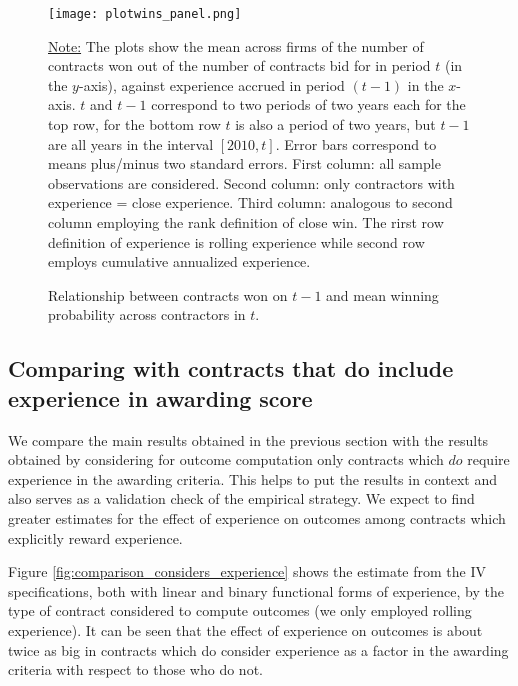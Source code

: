 \begin{figure}
  \texttt{[image: plotwins\_panel.png]}
  \caption{Relationship between contracts won on $t-1$ and mean winning probability across contractors in $t$.}
  \label{fig:plotresults_both}
  \vskip 0.5mm
  { \footnotesize \underline{Note:} The plots show the mean across firms of the number of contracts won out of the number of contracts bid for in period $t$ (in the $y$-axis), against experience accrued in period $(t-1)$ in the $x$-axis. $t$ and $t-1$ correspond to two periods of two years each for the top row, for the bottom row $t$ is also a period of two years, but $t-1$ are all years in the interval $[2010,t]$. Error bars correspond to means plus/minus two standard errors. First column: all sample observations are considered. Second column: only contractors with experience = close experience. Third column: analogous to second column employing the rank definition of close win.  The rirst row definition of experience is rolling experience while second row employs cumulative annualized experience.\par}
\end{figure}
\clearpage





\clearpage

\subsection{Comparing with contracts that do include experience in awarding score}

We compare the main results obtained in the previous section with the results obtained by considering for outcome computation only contracts which $do$ require experience in the awarding criteria. This helps to put the results in context and also serves as a validation check of the empirical strategy. We expect to find greater estimates for the effect of experience on outcomes among contracts which explicitly reward experience.

Figure \ref{fig:comparison_considers_experience} shows the estimate from the IV specifications, both with linear and binary functional forms of experience, by the type of contract considered to compute outcomes (we only employed rolling experience). It can be seen that the effect of experience on outcomes is about twice as big in contracts which do consider experience as a factor in the awarding criteria with respect to those who do not.

